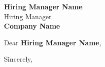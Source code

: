 \documentclass[10pt,letter]{letter}
\def\hm{\textbf{Hiring Manager Name}} %
\def\company{\textbf{Company Name}} %
\begin{document}
\begin{letter}{\hm \\ Hiring Manager \\ \company   }%

\opening{Dear \hm,}

\setlength\parindent{.5in}



 

\closing{Sincerely,}
\end{letter}
\end{document}
